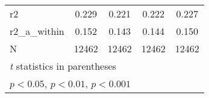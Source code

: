 {\begin{tabular}{l*{4}{c}}
\hline
r2          &       0.229         &       0.221         &       0.222         &       0.227         \\
r2\_a\_within &       0.152         &       0.143         &       0.144         &       0.150         \\
N           &       12462         &       12462         &       12462         &       12462         \\
\hline\hline
\multicolumn{5}{l}{\footnotesize \textit{t} statistics in parentheses}\\
\multicolumn{5}{l}{\footnotesize \sym{*} \(p<0.05\), \sym{**} \(p<0.01\), \sym{***} \(p<0.001\)}\\
\end{tabular}
}
